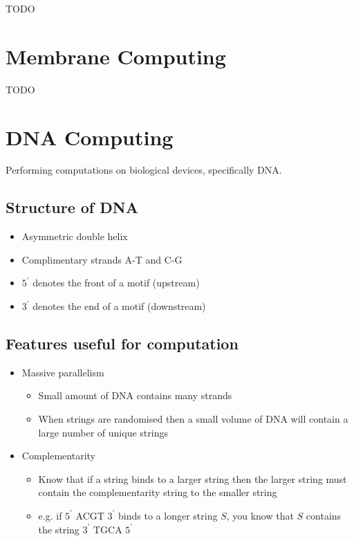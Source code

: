 \documentclass[a4paper]{article}
\begin{document}
TODO

\section{Membrane Computing}
\label{sec:membrane}

TODO

\section{DNA Computing}
\label{sec:dna}

Performing computations on biological devices, specifically DNA.

\subsection{Structure of DNA}

\begin{itemize}
  \item Asymmetric double helix
  \item Complimentary strands A-T and C-G
  \item $5^{\prime}$ denotes the front of a motif (upstream)
  \item $3^{\prime}$ denotes the end of a motif (downstream)
\end{itemize}

\subsection{Features useful for computation}

\begin{itemize}
  \item Massive parallelism
    \begin{itemize}
      \item Small amount of DNA contains many strands
      \item When strings are randomised then a small volume of DNA will contain
            a large number of unique strings
    \end{itemize}

  \item Complementarity
    \begin{itemize}
      \item Know that if a string binds to a larger string then the larger
            string must contain the complementarity string to the smaller string
      \item e.g. if $5^{\prime}$ ACGT $3^{\prime}$ binds to a longer string
            $S$, you know that $S$ contains the string $3^{\prime}$ TGCA
            $5^{\prime}$
    \end{itemize}
\end{itemize}
\end{document}
